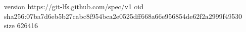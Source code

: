 version https://git-lfs.github.com/spec/v1
oid sha256:07ba7d6eb5b27cabc8f954bca2e0525dff668a66e956854de62f2a2999f49530
size 626416
